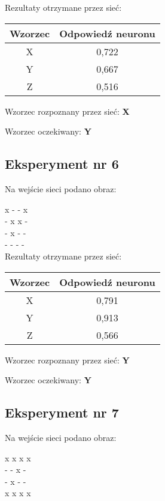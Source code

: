 \documentclass[12pt]{article}
\begin{document}
Rezultaty otrzymane przez sieć:

\begin{table}[h]
\begin{tabular}{|c|c|}
\hline 
Wzorzec & Odpowiedź neuronu \\ 
\hline 
X & 0,722 \\ \hline 
Y & 0,667 \\ \hline 
Z & 0,516 \\ \hline 
\end{tabular} 
\end{table}

Wzorzec rozpoznany przez sieć: \textbf{X}

Wzorzec oczekiwany: \textbf{Y}

\subsection{Eksperyment nr 6}

Na wejście sieci podano obraz:

\noindent
x - - x \\
- x x - \\
- x - - \\
- - - - \\

Rezultaty otrzymane przez sieć:

\begin{table}[h]
\begin{tabular}{|c|c|}
\hline 
Wzorzec & Odpowiedź neuronu \\ 
\hline 
X & 0,791 \\ \hline 
Y & 0,913 \\ \hline 
Z & 0,566 \\ \hline 
\end{tabular} 
\end{table}

Wzorzec rozpoznany przez sieć: \textbf{Y}

Wzorzec oczekiwany: \textbf{Y}

\clearpage

\subsection{Eksperyment nr 7}

Na wejście sieci podano obraz:

\noindent
x x x x \\
- - x - \\
- x - - \\
x x x x \\
\end{document}
